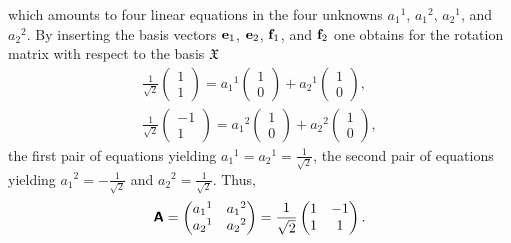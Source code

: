 {\begin{enumerate}
\begin{equation}
\end{equation}
which amounts to four linear equations in the four unknowns ${a_1}^1$, ${a_1}^2$,
${a_2}^1$, and ${a_2}^2$.
By
inserting the basis vectors
$ {\bf e}_1$, ${\bf e}_2$, ${\bf f}_1$, and ${\bf f}_2$
one obtains for the rotation matrix with respect to the basis ${\frak X}$
\begin{equation}
\begin{split}
\frac{1}{\sqrt{2}}
\begin{pmatrix}
1\\
1
\end{pmatrix}
=
{a_1}^1
\begin{pmatrix}
1 \\
0
\end{pmatrix}
+
{a_2}^1
\begin{pmatrix}
1 \\
0
\end{pmatrix} ,
\\
\frac{1}{\sqrt{2}}
\begin{pmatrix}
-1\\
1
\end{pmatrix}
=
{a_1}^2
\begin{pmatrix}
1 \\
0
\end{pmatrix}
+
{a_2}^2
\begin{pmatrix}
1 \\
0
\end{pmatrix}
,
\end{split}
\end{equation}
the first pair of equations yielding
${a_1}^1={a_2}^1=\frac{1}{\sqrt{2}}$,
the second pair of equations yielding
${a_1}^2=-\frac{1}{\sqrt{2}}$ and ${a_2}^2=\frac{1}{\sqrt{2}}$.
Thus,
\begin{equation}
 \textsf{\textbf{A}}=
\begin{pmatrix}
{a_1}^1&{a_1}^2\\
{a_2}^1&{a_2}^2
\end{pmatrix}
=
\frac{1}{\sqrt{2}}
\begin{pmatrix}
1&-1\\
1&1
\end{pmatrix}
.
\end{equation}


\end{enumerate}}
